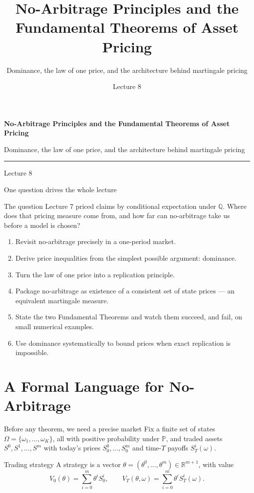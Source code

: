 \documentclass[handout,10pt,aspectratio=169]{beamer}
\title{No-Arbitrage Principles and the Fundamental Theorems of Asset Pricing}
\subtitle{Dominance, the law of one price, and the architecture behind martingale pricing}
\author{}
\date{Lecture 8}
\newcommand{\Pp}{\mathbb P}
\newcommand{\Q}{\mathbb Q}
\newcommand{\R}{\mathbb R}
\newcommand{\1}{\mathbf 1}
\begin{document}
\begin{frame}[plain]
  \vfill
  {\LARGE\bfseries\color{CourseBlue}No-Arbitrage Principles and the Fundamental Theorems of Asset Pricing\par}
  \medskip
  {\large Dominance, the law of one price, and the architecture behind martingale pricing\par}
  \medskip
  {\color{CourseGold}\rule{0.94\textwidth}{0.8pt}}
  \medskip
  {Lecture 8\par}
  \vfill
\end{frame}

\begin{frame}{One question drives the whole lecture}
\begin{block}{The question}
Lecture 7 priced claims by conditional expectation under \(\Q\). Where does
that pricing measure come from, and how far can no-arbitrage take us before a
model is chosen?
\end{block}
\begin{enumerate}
  \item Revisit no-arbitrage precisely in a one-period market.
  \item Derive price inequalities from the simplest possible argument:
        dominance.
  \item Turn the law of one price into a replication principle.
  \item Package no-arbitrage as existence of a consistent set of state prices
        --- an equivalent martingale measure.
  \item State the two Fundamental Theorems and watch them succeed, and fail,
        on small numerical examples.
  \item Use dominance systematically to bound prices when exact replication
        is impossible.
\end{enumerate}
\end{frame}

\section{A Formal Language for No-Arbitrage}

\begin{frame}{Before any theorem, we need a precise market}
Fix a finite set of states \(\Omega=\{\omega_1,\ldots,\omega_K\}\), all with
positive probability under \(\Pp\), and traded assets
\(S^0,S^1,\ldots,S^m\) with today's prices \(S_0^0,\ldots,S_0^m\) and
time-\(T\) payoffs \(S_T^i(\omega)\).
\begin{block}{Trading strategy}
A strategy is a vector \(\theta=(\theta^0,\ldots,\theta^m)\in\R^{m+1}\), with
value
\[
V_0(\theta)=\sum_{i=0}^m\theta^iS_0^i,
\qquad
V_T(\theta,\omega)=\sum_{i=0}^m\theta^iS_T^i(\omega).
\]
\end{block}
\end{frame}
\end{document}
